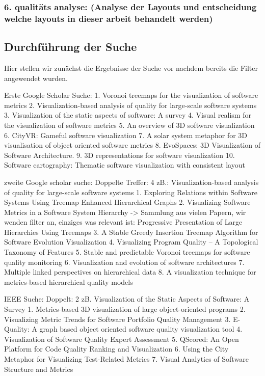 \subsubsection*{6. qualitäts analyse: (Analyse der Layouts und entscheidung welche layouts in dieser arbeit behandelt werden)} \label{sec:QualitaetsAnalyse}

\subsection{Durchführung der Suche}
Hier stellen wir zunächst die Ergebnisse der Suche vor nachdem bereits die Filter angewendet wurden.

Erste Google Scholar Suche:
1. Voronoi treemaps for the visualization of software metrics
2. Visualization-based analysis of quality for large-scale software systems
3. Visualization of the static aspects of software: A survey
4. Visual realism for the visualization of software metrics
5. An overview of 3D software visualization
6. CityVR: Gameful software visualization
7. A solar system metaphor for 3D visualisation of object oriented software metrics
8. EvoSpaces: 3D Visualization of Software Architecture.
9. 3D representations for software visualization
10. Software cartography: Thematic software visualization with consistent layout


zweite Google scholar suche:
Doppelte Treffer: 4 zB.: Visualization-based analysis of quality for large-scale software systems
1. Exploring Relations within Software Systems Using Treemap Enhanced Hierarchical Graphs
2. Visualizing Software Metrics in a Software System Hierarchy -> Sammlung aus vielen Papern, wir wenden filter an, einziges was relevant ist: Progressive Presentation of Large Hierarchies Using Treemaps
3. A Stable Greedy Insertion Treemap Algorithm for Software Evolution Visualization
4. Visualizing Program Quality – A Topological Taxonomy of Features 
5. Stable and predictable Voronoi treemaps for software quality monitoring
6. Visualization and evolution of software architectures
7. Multiple linked perspectives on hierarchical data
8. A visualization technique for metrics-based hierarchical quality models

IEEE Suche:
Doppelt: 2 zB. Visualization of the Static Aspects of Software: A Survey
1. Metrics-based 3D visualization of large object-oriented programs
2. Visualizing Metric Trends for Software Portfolio Quality Management
3. E-Quality: A graph based object oriented software quality visualization tool
4. Visualization of Software Quality Expert Assessment
5. QScored: An Open Platform for Code Quality Ranking and Visualization
6. Using the City Metaphor for Visualizing Test-Related Metrics
7. Visual Analytics of Software Structure and Metrics


